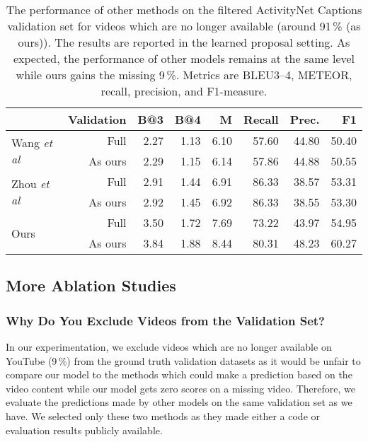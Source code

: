 \documentclass{src/bmvc2k}
\def\etal{\emph{et al}\bmvaOneDot}
\begin{document}
\begin{table}
\centering
\clearpage{}\newcommand{\parlength}{6.5em}

\begin{tabular}{lr rrr rrr}
\toprule 
& \textbf{Validation} & \textbf{B@3} & \textbf{B@4} & \textbf{M} & \textbf{Recall} & \textbf{Prec}. & \textbf{F1} \\
\midrule
\multirow{2}{*}{ \parbox{\parlength}{Wang \etal \cite{bafcg_Wang2018n}} } & Full & 2.27 & 1.13 & 6.10 & 57.60 & 44.80 & 50.40 \\
& As ours & 2.29 & 1.15 & 6.14 & 57.86 & 44.88 & 50.55 \\
\midrule
\multirow{2}{*}{ \parbox{\parlength}{Zhou \etal \cite{masked_transformer_Zhou2018}} } & Full & 2.91 & 1.44 & 6.91 & 86.33 & 38.57 & 53.31 \\
& As ours & 2.92 & 1.45 & 6.92 & 86.33 & 38.55 & 53.30 \\
\midrule
\multirow{2}{*}{ \parbox{\parlength}{Ours} } & Full & 3.50 & 1.72 & 7.69 & 73.22 & 43.97 & 54.95 \\
& As ours & 3.84 & 1.88 & 8.44 & 80.31 & 48.23 & 60.27 \\
\bottomrule
\end{tabular} \clearpage{}
\caption{The performance of other methods on the filtered ActivityNet Captions validation set for videos which are no longer available (around 91\,\% (as ours)). The results are reported in the learned proposal setting. As expected, the performance of other models remains at the same level while ours gains the missing 9\,\%. Metrics are BLEU3--4, METEOR, recall, precision, and F1-measure. \label{tab:other_models_no_missings}}
\end{table}

\subsection{More Ablation Studies \label{sec:more_ablation_studies}}
\subsubsection{Why Do You Exclude Videos from the Validation Set?\label{sec:other_models_no_missings}}

In our experimentation, we exclude videos which are no longer available on YouTube (9\,\%) from the ground truth validation datasets as it would be unfair to compare our model to the methods which could make a prediction based on the video content while our model gets zero scores on a missing video. Therefore, we evaluate the predictions made by other models \cite{masked_transformer_Zhou2018,bafcg_Wang2018n} on the same validation set as we have. We selected only these two methods as they made either a code or evaluation results publicly available.
\end{document}
